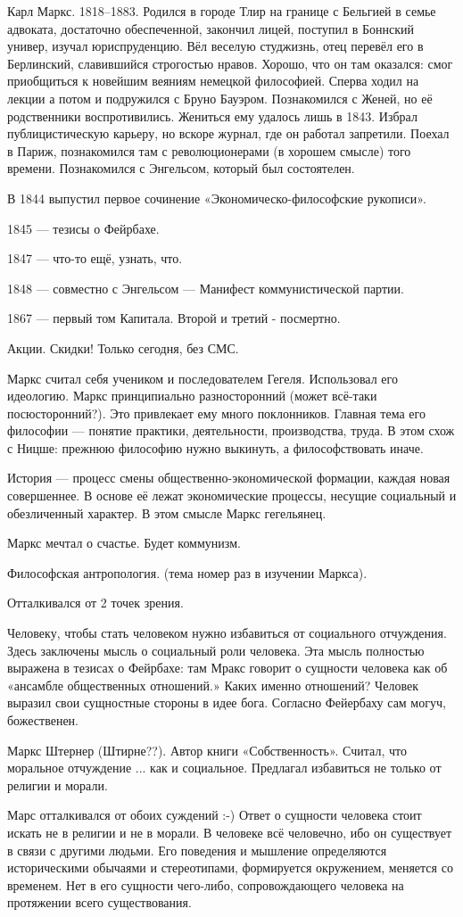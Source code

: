 
Карл Маркс. 1818--1883. Родился в городе Тлир на границе с Бельгией в семье адвоката, достаточно обеспеченной, закончил лицей, поступил в Боннский универ, изучал юриспруденцию. 
Вёл веселую студжизнь, отец перевёл его в Берлинский, славившийся строгостью нравов. Хорошо, что он там оказался: смог приобщиться к новейшим веяниям немецкой философией. 
Сперва ходил на лекции а потом и подружился с Бруно Бауэром. Познакомился с Женей, но её родственники воспротивились. Жениться ему удалось лишь в 1843.
Избрал публицистическую карьеру, но вскоре журнал, где он работал запретили. Поехал в Париж, познакомился там с революционерами (в хорошем смысле) того времени. Познакомился с Энгельсом, который был состоятелен. 

В 1844 выпустил первое сочинение «Экономическо-философские рукописи».

1845 --- тезисы о Фейрбахе.

1847 --- что-то ещё, узнать, что.

1848 --- совместно с Энгельсом --- Манифест коммунистической партии.

1867 --- первый том Капитала. Второй и третий - посмертно.

Акции. Скидки! Только сегодня, без СМС.

Маркс считал себя учеником и последователем Гегеля. Использовал его идеологию. Маркс принципиально разносторонний (может всё-таки посюсторонний?). Это привлекает ему много поклонников. Главная тема его философии --- понятие практики, деятельности, производства, труда. В этом схож с Ницше: прежнюю философию нужно выкинуть, а философствовать иначе.

История --- процесс смены общественно-экономической формации, каждая новая совершеннее. В основе её лежат экономические процессы, несущие социальный и обезличенный характер. В этом смысле Маркс гегельянец. 

Маркс мечтал о счастье.
Будет коммунизм.

Философская антропология. (тема номер раз в изучении Маркса).

Отталкивался от 2 точек зрения.

Человеку, чтобы стать человеком нужно избавиться от социального отчуждения. Здесь заключены мысль о социальный роли человека. Эта мысль полностью выражена в тезисах о Фейрбахе: там Мракс говорит о сущности человека как об «ансамбле общественных отношений.» Каких именно отношений? Человек выразил свои сущностные стороны в идее бога. Согласно Фейербаху сам могуч, божественен. 

Маркс Штернер (Штирне??). Автор книги «Собственность». Считал, что моральное отчуждение ... как и социальное.  Предлагал избавиться не только от религии и морали.

Марс отталкивался от обоих суждений :-)
Ответ о сущности человека стоит искать не в религии и не в морали. В человеке всё человечно, ибо он существует в связи с другими людьми. Его поведения и мышление определяются историческими обычаями и стереотипами, формируется окружением, меняется со временем.
Нет в его сущности чего-либо, сопровождающего человека на протяжении всего существования.